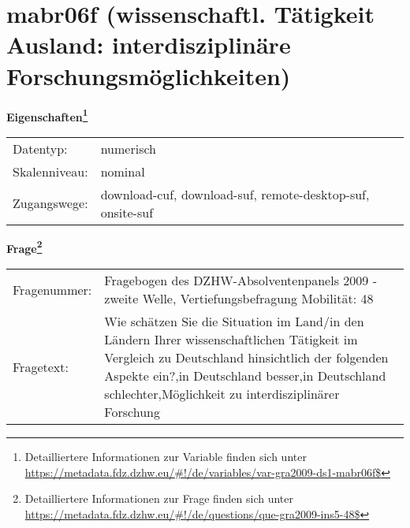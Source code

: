
    \setcounter{footnote}{0}

    \vspace*{-1.8cm}
	\section{mabr06f (wissenschaftl. Tätigkeit Ausland: interdisziplinäre Forschungsmöglichkeiten)}
	\label{section:mabr06f}



    \vspace*{0.5cm}
    \noindent\textbf{Eigenschaften\footnote{Detailliertere Informationen zur Variable finden sich unter
		\url{https://metadata.fdz.dzhw.eu/\#!/de/variables/var-gra2009-ds1-mabr06f$}}}\\
	\begin{tabularx}{\hsize}{@{}lX}
	Datentyp: & numerisch \\
	Skalenniveau: & nominal \\
	Zugangswege: &
	  download-cuf, 
	  download-suf, 
	  remote-desktop-suf, 
	  onsite-suf
 \\
    \end{tabularx}



				\vspace*{0.5cm}
                \noindent\textbf{Frage\footnote{Detailliertere Informationen zur Frage finden sich unter
		              \url{https://metadata.fdz.dzhw.eu/\#!/de/questions/que-gra2009-ins5-48$}}}\\
				\begin{tabularx}{\hsize}{@{}lX}
					Fragenummer: &
					  Fragebogen des DZHW-Absolventenpanels 2009 - zweite Welle, Vertiefungsbefragung Mobilität:
					  48
 \\
					Fragetext: & Wie schätzen Sie die Situation im Land/in den Ländern Ihrer wissenschaftlichen Tätigkeit im Vergleich zu Deutschland hinsichtlich der folgenden Aspekte ein?,in Deutschland besser,in Deutschland schlechter,Möglichkeit zu interdisziplinärer Forschung \\
				\end{tabularx}





